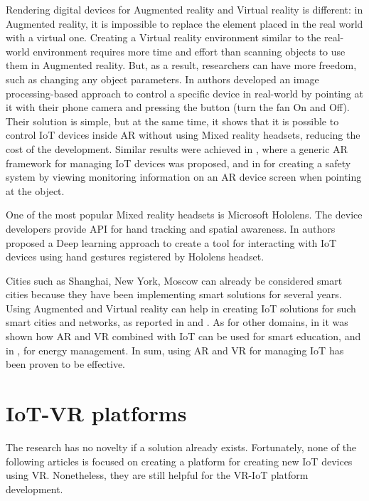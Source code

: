 Rendering digital devices for Augmented reality and Virtual reality is different: in Augmented reality, it is impossible to replace the element placed in the real world with a virtual one. Creating a Virtual reality environment similar to the real-world environment requires more time and effort than scanning objects to use them in Augmented reality. But, as a result, researchers can have more freedom, such as changing any object parameters. 
In \cite{ankireddy_augmented_2019} authors developed an image processing-based approach to control a specific device in real-world by pointing at it with their phone camera and pressing the button (turn the fan On and Off). Their solution is simple, but at the same time, it shows that it is possible to control IoT devices inside AR without using Mixed reality headsets, reducing the cost of the development. Similar results were achieved in \cite{jo_-situ_2016}, where a generic AR framework for managing IoT devices was proposed, and in \cite{alam_augmented_2017} for creating a safety system by viewing monitoring information on an AR device screen when pointing at the object.

One of the most popular Mixed reality headsets is Microsoft Hololens. The device developers provide API for hand tracking and spatial awareness. In \cite{sun_magichand_2019} authors proposed a Deep learning approach to create a tool for interacting with IoT devices using hand gestures registered by Hololens headset. 

Cities such as Shanghai, New York, Moscow can already be considered smart cities because they have been implementing smart solutions for several years. Using Augmented and Virtual reality can help in creating IoT solutions for such smart cities and networks, as reported in \cite{chakareski_uav-iot_2019} and \cite{carneiro_bim_2018}. As for other domains, in \cite{paul_role_2019} it was shown how AR and VR combined with IoT can be used for smart education, and in \cite{jang_building_2019-1}, for energy management. In sum, using AR and VR for managing IoT has been proven to be effective.

\section{IoT-VR platforms}

The research has no novelty if a solution already exists. Fortunately, none of the following articles is focused on creating a platform for creating new IoT devices using VR. Nonetheless, they are still helpful for the VR-IoT platform development.

